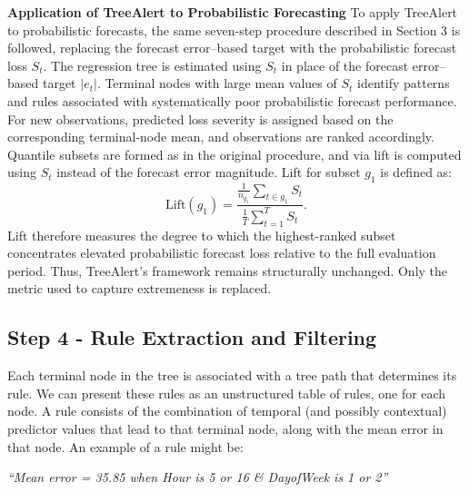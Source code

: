 \documentclass[]{interact}
\theoremstyle{plain}
\theoremstyle{definition}
\theoremstyle{remark}
\begin{document}
\noindent\textbf{Application of TreeAlert to Probabilistic Forecasting} To apply TreeAlert to probabilistic forecasts, the same seven-step procedure described in Section 3 is followed, replacing the forecast error--based target with the probabilistic forecast loss $S_t$. The regression tree is estimated using $S_t$ in place of the forecast error--based target $|e_t|$. Terminal nodes with large mean values of $S_t$ identify patterns and rules associated with systematically poor probabilistic forecast performance. For new observations, predicted loss severity is assigned based on the corresponding terminal-node mean, and observations are ranked accordingly. Quantile subsets are formed as in the original procedure, and via lift is computed using $S_t$ instead of the forecast error magnitude. Lift for subset $g_{1}$ is defined as:
\begin{equation}
\text{Lift}(g_{1}) =
\frac{
\displaystyle \frac{1}{n_{g_1}} \sum_{t \in g_{1}} S_t
}{
\displaystyle \frac{1}{T} \sum_{t=1}^{T} S_t
}.
\end{equation}
Lift therefore measures the degree to which the highest-ranked subset concentrates elevated probabilistic forecast loss relative to the full evaluation period. Thus, TreeAlert's framework remains structurally unchanged. Only the metric used to capture extremeness is replaced.

\subsection{Step 4 - Rule Extraction and Filtering}
\label{sec:rule-extraction}
Each terminal node in the tree is associated with a tree path that determines its rule. We can present these rules as an unstructured table of rules, one for each node. A rule consists of the combination of temporal (and possibly contextual) predictor values that lead to that terminal node, along with the mean error in that node. An example of a rule might be:
\begin{center}
\textit{``Mean error = 35.85 when Hour is 5 or 16 \& DayofWeek is 1 or 2''}
\end{center}
\end{document}
